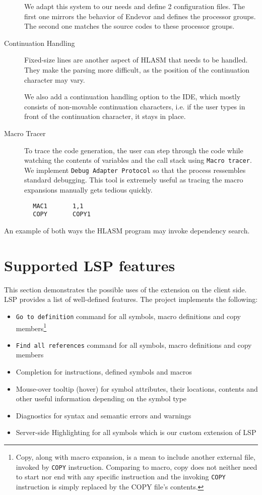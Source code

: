 \begin{description}
We adapt this system to our needs and define 2 configuration files. The first one mirrors the behavior of Endevor and defines the processor groups. The second one matches the source codes to these processor groups.

\item [Continuation Handling] Fixed-size lines are another aspect of HLASM that needs to be handled. They make the parsing more difficult, as the position of the continuation character may vary. 

We also add a continuation handling option to the IDE, which mostly consists of non-movable continuation characters, i.e. if the user types in front of the continuation character, it stays in place.

\item [Macro Tracer] To trace the code generation, the user can step through the code while watching the contents of variables and the call stack using \texttt{Macro tracer}. We implement \texttt{Debug Adapter Protocol} so that the process ressembles standard debugging. This tool is extremely useful as tracing the macro expansions manually gets tedious quickly.
\end{description}

\pagebreak
\begin{listing}
\begin{verbatim}
        MAC1       1,1                   
        COPY       COPY1
\end{verbatim} 
\caption{An example of both ways the HLASM program may invoke dependency search.}
\label{lst:search}
\end{listing}

\section{Supported LSP features}
This section demonstrates the possible uses of the extension on the client side. LSP provides a list of well-defined features. The project implements the following:

\begin{itemize}
	\item \texttt{Go to definition} command for all symbols, macro definitions and copy members\footnote{Copy, along with macro expansion, is a mean to include another external file, invoked by \texttt{COPY} instruction. Comparing to macro, copy does not neither need to start nor end with any specific instruction and the invoking \texttt{COPY} instruction is simply replaced by the COPY file's contents.}
	\item \texttt{Find all references} command for all symbols, macro definitions and copy members
	\item Completion for instructions, defined symbols and macros
	\item Mouse-over tooltip (hover) for symbol attributes, their locations, contents and other useful information depending on the symbol type
	\item Diagnostics for syntax and semantic errors and warnings
	\item Server-side Highlighting for all symbols which is our custom extension of LSP  
\end{itemize}

